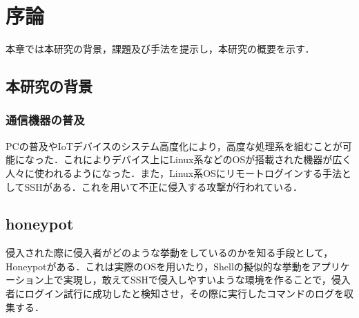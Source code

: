 \chapter{序論}
\label{intr}

本章では本研究の背景，課題及び手法を提示し，本研究の概要を示す．

\section{本研究の背景}

\subsection{通信機器の普及}
\label{intr:back}
PCの普及やIoTデバイスのシステム高度化により，高度な処理系を組むことが可能になった．これによりデバイス上にLinux系などのOSが搭載された機器が広く人々に使われるようになった．また，Linux系OSにリモートログインする手法としてSSHがある．これを用いて不正に侵入する攻撃が行われている．

\section{honeypot}
\label{intr:honey}
 侵入された際に侵入者がどのような挙動をしているのかを知る手段として，Honeypotがある．これは実際のOSを用いたり，Shellの擬似的な挙動をアプリケーション上で実現し，敢えてSSHで侵入しやすいような環境を作ることで，侵入者にログイン試行に成功したと検知させ，その際に実行したコマンドのログを収集する．

